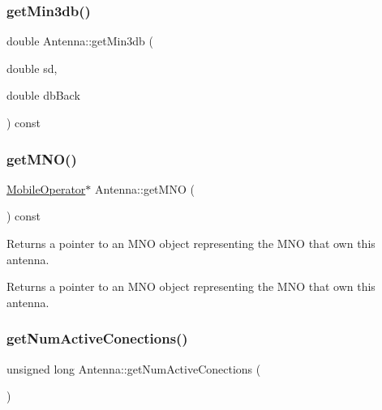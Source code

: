 \mbox{\label{class_antenna_a1c6126c232ee496b9b693fc20e4892f5}} 
\subsubsection{\texorpdfstring{get\+Min3db()}{getMin3db()}}
{\footnotesize\ttfamily double Antenna\+::get\+Min3db (\begin{DoxyParamCaption}\item[{double}]{sd,  }\item[{double}]{db\+Back }\end{DoxyParamCaption}) const\hspace{0.3cm}{\ttfamily [private]}}

\mbox{\label{class_antenna_abfbb4a654f73fe0c3a30f50777f79349}} 
\subsubsection{\texorpdfstring{get\+M\+N\+O()}{getMNO()}}
{\footnotesize\ttfamily \hyperlink{class_mobile_operator}{Mobile\+Operator}$\ast$ Antenna\+::get\+M\+NO (\begin{DoxyParamCaption}{ }\end{DoxyParamCaption}) const}

Returns a pointer to an M\+NO object representing the M\+NO that own this antenna. \begin{DoxyReturn}{Returns}
a pointer to an M\+NO object representing the M\+NO that own this antenna. 
\end{DoxyReturn}
\mbox{\label{class_antenna_a86c5c094ab6ea432609afa00f3a8080a}} 
\subsubsection{\texorpdfstring{get\+Num\+Active\+Conections()}{getNumActiveConections()}}
{\footnotesize\ttfamily unsigned long Antenna\+::get\+Num\+Active\+Conections (\begin{DoxyParamCaption}{ }\end{DoxyParamCaption})\hspace{0.3cm}{\ttfamily [private]}}

